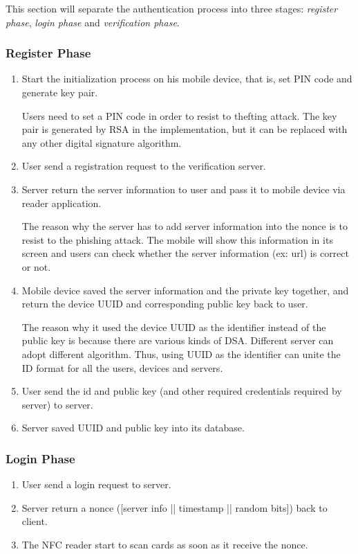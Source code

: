 \begin{CJK}{Bg5}{bsmi}
{{This section will separate the authentication process into three stages: \emph{register phase}, \emph{login phase} and \emph{verification phase}.

\subsubsection{Register Phase}

\begin{enumerate}
\item Start the initialization process on his mobile device, that is, set PIN code and generate key pair.

Users need to set a PIN code in order to resist to thefting attack. The key pair is generated by RSA in the implementation, but it can be replaced with any other digital signature algorithm.

\item User send a registration request to the verification server.
\item Server return the server information to user and pass it to mobile device via reader application.

The reason why the server has to add server information into the nonce is to resist to the phishing attack. The mobile will show this information in its screen and users can check whether the server information (ex: url) is correct or not.

\item Mobile device saved the server information and the private key together, and return the device UUID and corresponding public key back to user.

The reason why it used the device UUID as the identifier instead of the public key is because there are various kinds of DSA. Different server can adopt different algorithm. Thus, using UUID as the identifier can unite the ID format for all the users, devices and servers.

\item User send the id and public key (and other required credentials required by server) to server.
\item Server saved UUID and public key into its database.
\end{enumerate}

\subsubsection{Login Phase}

\begin{enumerate}
\item User send a login request to server.
\item Server return a nonce ([server info || timestamp || random bits]) back to client.
\item The NFC reader start to scan cards as soon as it receive the nonce.


\end{enumerate}}}
\end{CJK}
